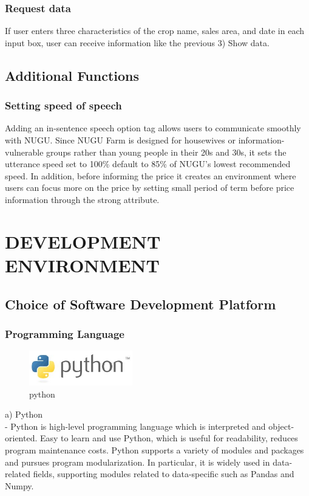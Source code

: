 \documentclass[conference]{IEEEtran}
\begin{document}
\subsubsection{Request data}
If user enters three characteristics of the crop name, sales area, and date in each input box, user can receive information like the previous 3) Show data.
\subsection{Additional Functions}
\subsubsection{Setting speed of speech}
Adding an in-sentence speech option tag allows users to communicate smoothly with NUGU. Since NUGU Farm is designed for housewives or information-vulnerable groups rather than young people in their 20s and 30s, it sets the utterance speed set to 100\% default to 85\% of NUGU's lowest recommended speed. In addition, before informing the price it creates an environment where users can focus more on the price by setting small period of term before price information through the strong attribute.

\section{DEVELOPMENT ENVIRONMENT}
\subsection{Choice of Software Development Platform}
\subsubsection{Programming Language}
\begin{figure}[!htbp]
\centering
    \includegraphics[width =4.5cm]{python}
    \hfil
\caption{python}
\label{python}
\end{figure}

{a)	Python\\
-	Python is high-level programming language which is interpreted and object-oriented. Easy to learn and use Python, which is useful for readability, reduces program maintenance costs. Python supports a variety of modules and packages and pursues program modularization. In particular, it is widely used in data-related fields, supporting modules related to data-specific such as Pandas and Numpy.}
\end{document}
